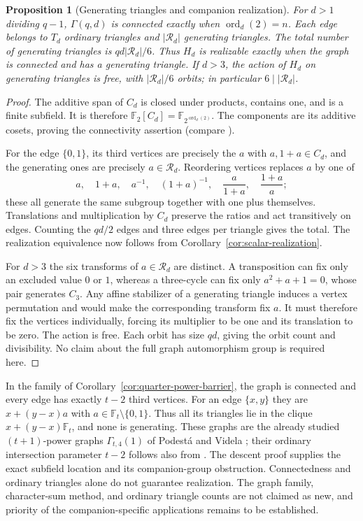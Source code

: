 \documentclass[11pt]{article}
\newtheorem{proposition}[theorem]{Proposition}
\begin{document}
\begin{proposition}[Generating triangles and companion realization]
\label{prop:Paley-generating-triangles}
For $d>1$ dividing $q-1$, $\Gamma(q,d)$ is connected exactly when
$\operatorname{ord}_d(2)=n$. Each edge belongs to $T_d$ ordinary
triangles and $|\mathcal R_d|$ generating triangles. The total number
of generating triangles is $qd|\mathcal R_d|/6$.
Thus $H_d$ is realizable exactly when the graph is connected and
has a generating triangle.
If $d>3$, the action of $H_d$ on generating triangles is free,
with $|\mathcal R_d|/6$ orbits; in particular $6\mid|\mathcal R_d|$.
\end{proposition}
\begin{proof}
The additive span of $C_d$ is closed under products, contains one,
and is a finite subfield. It is therefore $\mathbb F_2[C_d]
=\mathbb F_{2^{\operatorname{ord}_d(2)}}$.
The components are its additive cosets, proving the connectivity
assertion (compare \cite[Theorem~2.2]{LP09}).

For the edge $\{0,1\}$, its third vertices are precisely the $a$
with $a,1+a\in C_d$, and the generating ones are precisely
$a\in\mathcal R_d$. Reordering vertices replaces $a$ by one of
\[
 a,\quad 1+a,\quad a^{-1},\quad(1+a)^{-1},\quad
 \frac{a}{1+a},\quad\frac{1+a}{a};
\]
these all generate the same subgroup together with one plus themselves.
Translations and multiplication by $C_d$ preserve the ratios and act
transitively on edges. Counting the $qd/2$ edges and three edges per
triangle gives the total. The realization equivalence now follows
from Corollary~\ref{cor:scalar-realization}.

For $d>3$ the six transforms of $a\in\mathcal R_d$ are distinct.
A transposition can fix only an excluded value $0$ or $1$, whereas
a three-cycle can fix only $a^2+a+1=0$, whose pair generates $C_3$.
Any affine stabilizer of a generating triangle induces a vertex
permutation and would make the corresponding transform fix $a$.
It must therefore fix the vertices individually, forcing its
multiplier to be one and its translation to be zero.
The action is free. Each orbit has size $qd$, giving the orbit count
and divisibility. No claim about the full graph automorphism group
is required here.
\end{proof}

In the family of Corollary~\ref{cor:quarter-power-barrier}, the graph
is connected and every edge has exactly $t-2$ third vertices. For an
edge $\{x,y\}$ they are $x+(y-x)a$ with
$a\in\mathbb F_t\setminus\{0,1\}$. Thus all its triangles lie in the
clique $x+(y-x)\mathbb F_t$, and none is generating.
These graphs are the already studied $(t+1)$-power graphs
$\Gamma_{t,4}(1)$ of Podest\'a and Videla \cite{PV24}; their ordinary
intersection parameter $t-2$ follows also from
\cite[Theorem~5.2]{PV24}. The descent proof supplies the exact subfield
location and its companion-group obstruction. Connectedness and
ordinary triangles alone do not guarantee realization.
The graph family, character-sum method, and ordinary triangle counts
are not claimed as new, and priority of the companion-specific
applications remains to be established.
\end{document}

